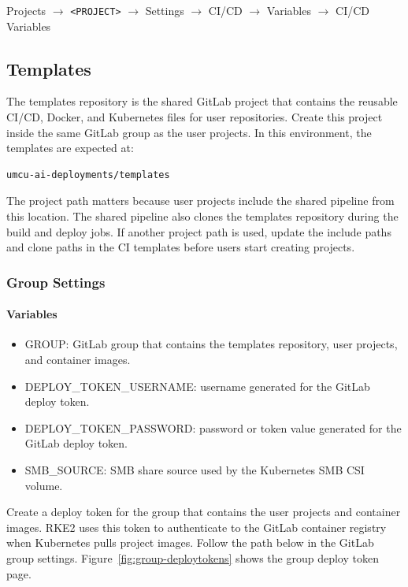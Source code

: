 \documentclass{article}
\begin{document}
\vspace{0.5cm}

Projects $\rightarrow$ \texttt{<PROJECT>} $\rightarrow$ Settings $\rightarrow$ CI/CD $\rightarrow$ Variables $\rightarrow$ CI/CD Variables
\vspace{0.4cm}
\subsection{Templates}

The templates repository is the shared GitLab project that contains the reusable CI/CD, Docker, and Kubernetes files for user repositories. Create this project inside the same GitLab group as the user projects. In this environment, the templates are expected at:

\begin{lstlisting}[language=sh]
umcu-ai-deployments/templates
\end{lstlisting}

The project path matters because user projects include the shared pipeline from this location. The shared pipeline also clones the templates repository during the build and deploy jobs. If another project path is used, update the include paths and clone paths in the CI templates before users start creating projects.

\subsubsection{Group Settings}

\paragraph{Variables}
\begin{itemize}
	\item GROUP: GitLab group that contains the templates repository, user projects, and container images.
	\item DEPLOY\_TOKEN\_USERNAME: username generated for the GitLab deploy token.
	\item DEPLOY\_TOKEN\_PASSWORD: password or token value generated for the GitLab deploy token.
	\item SMB\_SOURCE: SMB share source used by the Kubernetes SMB CSI volume.
\end{itemize}

Create a deploy token for the group that contains the user projects and container images. RKE2 uses this token to authenticate to the GitLab container registry when Kubernetes pulls project images. Follow the path below in the GitLab group settings. Figure~\ref{fig:group-deploytokens} shows the group deploy token page.
\end{document}
